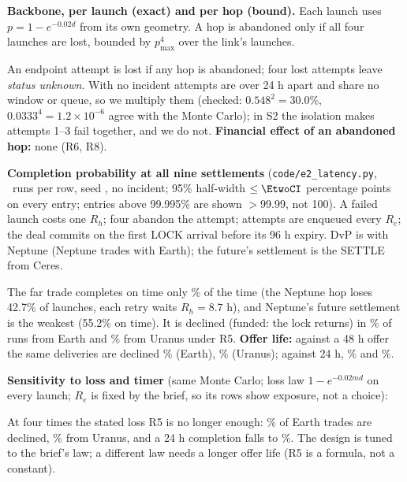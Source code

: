 \textbf{Backbone, per launch (exact) and per hop (bound).} Each launch uses $p = 1 - e^{-0.02d}$ from its own
geometry. A hop is abandoned only if all four launches are lost, bounded by $p_{\max}^4$ over the link's launches.
\begin{center}\setlength{\tabcolsep}{4pt}\end{center}
An endpoint attempt is lost if any hop is abandoned; four lost attempts leave \emph{status unknown}. With no incident
attempts are over 24 h apart and share no window or queue, so we multiply them (checked: $0.548^2 = 30.0\%$, $0.0333^4 = 1.2\times10^{-6}$ agree with the
Monte Carlo); in S2 the isolation makes attempts 1--3 fail together, and we do not. \textbf{Financial effect of an abandoned hop:} none
(R6, R8).

\textbf{Completion probability at all nine settlements} (\texttt{code/e2\_latency.py}, \EtwoN\ runs per row, seed \EtwoSeed, no incident;
95\% half-width $\le \EtwoCI$ percentage points on every entry; entries above 99.995\% are shown $>$99.99, not 100). A failed launch costs one $R_h$;
four abandon the attempt; attempts are enqueued every $R_e$; the deal commits on the first LOCK arrival before its 96 h expiry. DvP is with Neptune (Neptune trades with Earth); the future's settlement is the SETTLE from Ceres.
\begin{center}\setlength{\tabcolsep}{4pt}\end{center}
The far trade completes on time only \EtwoVMEarthNoLoss\% of the time (the Neptune hop loses 42.7\% of launches, each retry waits $R_h = 8.7$ h), and Neptune's future settlement is the weakest (55.2\% on time). It is declined (funded: the lock
returns) in \EtwoVMEarthDecline\% of runs from Earth and \EtwoVMUranusDecline\% from Uranus under R5. \textbf{Offer life:} against a 48 h
offer the same deliveries are declined \EtwoVMEarthDeclineFortyEight\% (Earth), \EtwoVMUranusDeclineFortyEight\% (Uranus); against 24 h,
\EtwoVMEarthDeclineTwentyFour\% and \EtwoVMUranusDeclineTwentyFour\%.

\textbf{Sensitivity to loss and timer} (same Monte Carlo; loss law $1-e^{-0.02md}$ on every launch; $R_e$ is fixed by the brief, so its rows show exposure, not a choice):
\begin{center}\setlength{\tabcolsep}{4pt}\end{center}
At four times the stated loss R5 is no longer enough: \EtwoSweepLossFourDecline\% of Earth trades are declined, \EtwoSweepLossFourUranusDecline\% from Uranus, and a 24 h completion falls to \EtwoSweepLossFourDay\%. The
design is tuned to the brief's law; a different law needs a longer offer life (R5 is a formula, not a constant).

